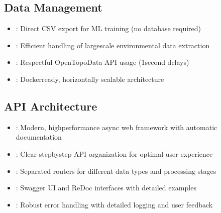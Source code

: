 \documentclass[letterpaper,10pt,english]{sphinxmanual}
\begin{document}
\subsection{Data Management}
\label{\detokenize{overview:data-management}}\begin{itemize}
\item {} 
\sphinxAtStartPar
{}: Direct CSV export for ML training (no database required)

\item {} 
\sphinxAtStartPar
{}: Efficient handling of large\sphinxhyphen{}scale environmental data extraction

\item {} 
\sphinxAtStartPar
{}: Respectful Open\sphinxhyphen{}Topo\sphinxhyphen{}Data API usage (1\sphinxhyphen{}second delays)

\item {} 
\sphinxAtStartPar
{}: Docker\sphinxhyphen{}ready, horizontally scalable architecture

\end{itemize}


\subsection{API Architecture}
\label{\detokenize{overview:api-architecture}}\begin{itemize}
\item {} 
\sphinxAtStartPar
{}: Modern, high\sphinxhyphen{}performance async web framework with automatic documentation

\item {} 
\sphinxAtStartPar
{}: Clear step\sphinxhyphen{}by\sphinxhyphen{}step API organization for optimal user experience

\item {} 
\sphinxAtStartPar
{}: Separated routers for different data types and processing stages

\item {} 
\sphinxAtStartPar
{}: Swagger UI and ReDoc interfaces with detailed examples

\item {} 
\sphinxAtStartPar
{}: Robust error handling with detailed logging and user feedback

\end{itemize}
\end{document}
